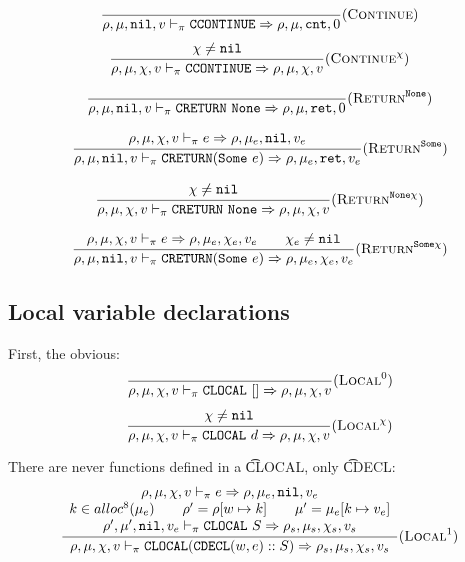 \[\dfrac{
}{\rho,\mu,\texttt{nil},v \vdash_\pi \texttt{CCONTINUE} \Rightarrow \rho,\mu,\texttt{cnt},0} (\textsc{Continue})\]
\[\dfrac{\begin{array}{c}
    \chi\ne\texttt{nil}
\end{array}}{\rho,\mu,\chi,v \vdash_\pi \texttt{CCONTINUE} \Rightarrow \rho,\mu,\chi,v} (\textsc{Continue}^\chi)\]

\[\dfrac{
}{\rho,\mu,\texttt{nil},v \vdash_\pi \texttt{CRETURN}\ \texttt{None} \Rightarrow \rho,\mu,\texttt{ret},0} (\textsc{Return}^{\texttt{None}})\]

\[\dfrac{\begin{array}{c}
    \rho,\mu,\chi,v \vdash_\pi e \Rightarrow \rho,\mu_e,\texttt{nil},v_e
\end{array}}{\rho,\mu,\texttt{nil},v \vdash_\pi \texttt{CRETURN}(\texttt{Some}\ e) \Rightarrow \rho,\mu_e,\texttt{ret},v_e} (\textsc{Return}^{\texttt{Some}})\]

\[\dfrac{\begin{array}{c}
    \chi\ne\texttt{nil}
\end{array}}{\rho,\mu,\chi,v \vdash_\pi \texttt{CRETURN}\ \texttt{None} \Rightarrow \rho,\mu,\chi,v} (\textsc{Return}^{\texttt{None}\chi})\]

\[\dfrac{\begin{array}{c}
    \rho,\mu,\chi,v \vdash_\pi e \Rightarrow \rho,\mu_e,\chi_e,v_e \qquad \chi_e\ne\texttt{nil}
\end{array}}{\rho,\mu,\texttt{nil},v \vdash_\pi \texttt{CRETURN}(\texttt{Some}\ e) \Rightarrow \rho,\mu_e,\chi_e,v_e} (\textsc{Return}^{\texttt{Some}\chi})\]

\subsection{Local variable declarations}

First, the obvious:
\[\dfrac{\begin{array}{c}
\end{array}}{\rho,\mu,\chi,v \vdash_\pi \texttt{CLOCAL}\ [] \Rightarrow \rho,\mu,\chi,v} (\textsc{Local}^0)\]
\[\dfrac{\begin{array}{c}
    \chi\ne\texttt{nil}
\end{array}}{\rho,\mu,\chi,v \vdash_\pi \texttt{CLOCAL}\ d \Rightarrow \rho,\mu,\chi,v} (\textsc{Local}^\chi)\]

There are never functions defined in a \t{CLOCAL}, only \t{CDECL}:
\[\dfrac{\begin{array}{c}
    \rho,\mu,\chi,v \vdash_\pi e \Rightarrow \rho,\mu_e,\texttt{nil},v_e \\
    k \in alloc^8(\mu_e) \qquad \rho' = \rho[w \mapsto k] \qquad \mu' = \mu_e[k \mapsto v_e] \\
    \rho',\mu',\texttt{nil},v_e \vdash_\pi \texttt{CLOCAL}\ S \Rightarrow \rho_s,\mu_s,\chi_s,v_s
\end{array}}{\rho,\mu,\chi,v \vdash_\pi \texttt{CLOCAL}(\texttt{CDECL}(w,e)::S) \Rightarrow \rho_s,\mu_s,\chi_s,v_s} (\textsc{Local}^1)\]


